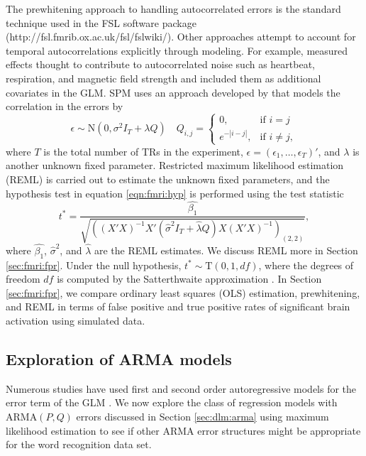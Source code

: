 The prewhitening approach to handling autocorrelated errors is the standard technique used in the FSL software package (http://fsl.fmrib.ox.ac.uk/fsl/fslwiki/). Other approaches attempt to account for temporal autocorrelations explicitly through modeling. For example, \citet{lund:mad:nvr:2006} measured effects thought to contribute to autocorrelated noise such as heartbeat, respiration, and magnetic field strength and included them as additional covariates in the GLM. SPM uses an approach developed by \citet{kiebel:holmes:spm:2007} that models the correlation in the errors by
\begin{equation}
\epsilon \sim \mbox{N}(0,\sigma^2 I_T + \lambda Q) \quad Q_{i,j} = \left\{\begin{array}{ll} 0, & \mbox{if } i=j \\ e^{-|i-j|}, & \mbox{if } i\ne j, \end{array} \right.
\end{equation}
where $T$ is the total number of TRs in the experiment, $\epsilon = (\epsilon_1,\ldots,\epsilon_T)'$, and $\lambda$ is another unknown fixed parameter. Restricted maximum likelihood estimation (REML) is carried out to estimate the unknown fixed parameters, and the hypothesis test in equation \eqref{eqn:fmri:hyp} is performed using the test statistic
\begin{equation}
t^* = \frac{\hat{\beta_1}}{\sqrt{\left((X'X)^{-1}X'(\hat{\sigma}^2 I_T + \hat{\lambda} Q)X(X'X)^{-1}\right)_{(2,2)}}}, \label{eqn:fmri:hyp-reml}
\end{equation}
where $\hat{\beta_1}$, $\hat{\sigma}^2$, and $\hat{\lambda}$ are the REML estimates. We discuss REML more in Section \ref{sec:fmri:fpr}. Under the null hypothesis, $t^* \sim \mbox{T}(0,1,df)$, where the degrees of freedom $df$ is computed by the Satterthwaite approximation \citep{wors:frist:color:1995}. In Section \ref{sec:fmri:fpr}, we compare ordinary least squares (OLS) estimation, prewhitening, and REML in terms of false positive and true positive rates of significant brain activation using simulated data.

\subsection{Exploration of ARMA models \label{sec:fmri:arma}}

Numerous studies have used first and second order autoregressive models for the error term of the GLM \citep{bullmore:prewhiten:1996, loc:jos:arma:1997}. We now explore the class of regression models with $\mbox{ARMA}(P,Q)$ errors discussed in Section \ref{sec:dlm:arma} using maximum likelihood estimation to see if other ARMA error structures might be appropriate for the word recognition data set.

